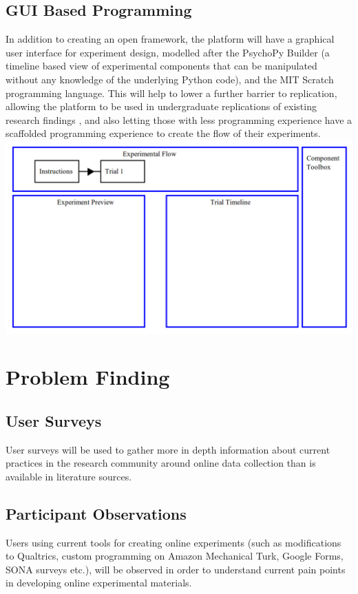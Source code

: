 \documentclass[12pt,a4paper,titlepage]{scrreprt}
\begin{document}
\subsection{GUI Based Programming}
In addition to creating an open framework, the platform will have a graphical user interface for experiment design, modelled after the PsychoPy Builder (a timeline based view of experimental components that can be manipulated without any knowledge of the underlying Python code), and the MIT Scratch programming language\cite{resnick_scratch:_2009}. This will help to lower a further barrier to replication, allowing the platform to be used in undergraduate replications of existing research findings \cite{frank_teaching_2012}, and also letting those with less programming experience have a scaffolded programming experience to create the flow of their experiments.\\
\includegraphics[scale=0.4]{edit_interface}\\
\section{Problem Finding}
\subsection{User Surveys}
User surveys will be used to gather more in depth information about current practices in the research community around online data collection than is available in literature sources.
\subsection{Participant Observations}
Users using current tools for creating online experiments (such as modifications to Qualtrics, custom programming on Amazon Mechanical Turk, Google Forms, SONA surveys etc.), will be observed in order to understand current pain points in developing online experimental materials.
\end{document}
